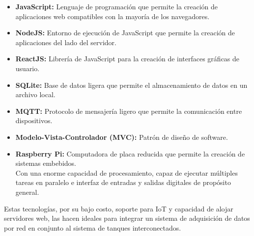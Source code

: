      \begin{itemize}
        \item \textbf{JavaScript:} Lenguaje de programación que permite la creación de aplicaciones web compatibles con la mayoría de los navegadores.
        \item \textbf{NodeJS:} Entorno de ejecución de JavaScript que permite la creación de aplicaciones del lado del servidor.
        \item \textbf{ReactJS:} Librería de JavaScript para la creación de interfaces gráficas de usuario.
        \item \textbf{SQLite:} Base de datos ligera que permite el almacenamiento de datos en un archivo local.
        \item \textbf{MQTT:} Protocolo de mensajería ligero que permite la comunicación entre dispositivos.
        \item \textbf{Modelo-Vista-Controlador (MVC):} Patrón de diseño de software.
        \item \textbf{Raspberry Pi:} Computadora de placa reducida que permite la creación de sistemas embebidos. \\ 
        Con una enorme capacidad de procesamiento, capaz de ejecutar múltiples tareas en paralelo  e interfaz de entradas y salidas digitales de propósito general.
     \end{itemize}

     Estas tecnologías, por su bajo costo, soporte para IoT y capacidad de alojar servidores web, las hacen ideales para integrar un sistema de adquisición de datos por red en conjunto al sistema de tanques interconectados.